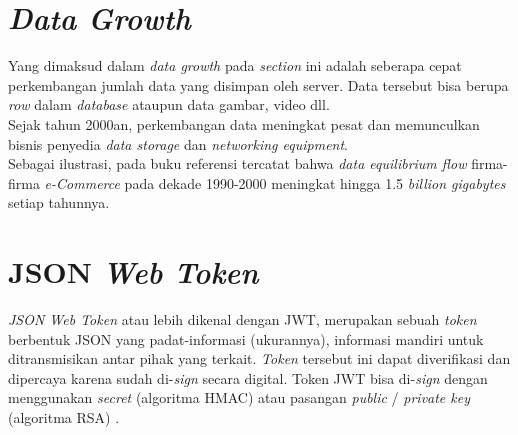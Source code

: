 	\section{  \textit{Data Growth}}
	Yang dimaksud dalam \textit{data growth} pada \textit{section} ini adalah seberapa cepat perkembangan jumlah data yang disimpan oleh server. Data tersebut bisa berupa \textit{row} dalam \textit{database} ataupun data gambar, video dll\cite{insidebigdata_exponential_2017}.
	\\ \indent
	Sejak tahun 2000an, perkembangan data meningkat pesat dan memunculkan bisnis penyedia \textit{data storage} dan \textit{networking equipment}.
	\\ \indent Sebagai ilustrasi, pada buku referensi tercatat bahwa \textit{data equilibrium flow} firma-firma \textit{e-Commerce} pada dekade 1990-2000 meningkat hingga 1.5 \textit{billion gigabytes} setiap tahunnya\cite{d._vanhoose_e-commerce_2011}.
	
	
	\section{  JSON \textit{Web Token}}
	\textit{JSON Web Token }atau lebih dikenal dengan JWT, merupakan sebuah \textit{token} berbentuk JSON yang padat-informasi (ukurannya), informasi mandiri untuk ditransmisikan antar pihak yang terkait. \textit{Token} tersebut ini dapat diverifikasi dan dipercaya karena sudah di-\textit{sign} secara digital. Token JWT bisa di-\textit{sign} dengan menggunakan \textit{secret} (algoritma HMAC) atau pasangan \textit{public} / \textit{private key} (algoritma RSA) \cite{noauthor_jwt_2016}.
	
